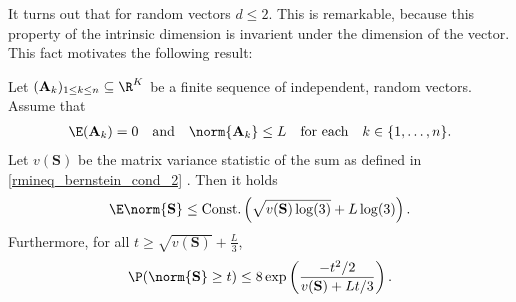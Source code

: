 It turns out that for random vectors $ d \le 2 $. This is remarkable, because this property of the intrinsic dimension is invarient under the dimension of the vector. This fact motivates the following result:
\begin{corollary}
  \label{rmineq_intrinsic_bernstein_vector_corollary}
  Let $(\mathbf{A}_k)_{1\le k \le n}\subseteq\R^{K}$ be a finite sequence of independent, random vectors. Assume that
    \begin{gather}
      \label{rmineq_bernstein_cond_1}
      \E(\mathbf{A}_k)=0\quad\text{and}\quad\norm{\mathbf{A}_k}\le L \quad \text{for each}\quad  k\in \{1,\ldots,n\}.
    \end{gather}
    Let $v(\mathbf{S})$ be the matrix variance statistic of the sum 
    as defined in
    \eqref{rmineq_bernstein_cond_2}
    .
  Then 
  it holds
      \begin{align}
        \label{rmineq_intrinsic_bernstein_expectation_bound}
        \E\norm{\mathbf{S}}\le \text{Const.}\left( \sqrt{v(\mathbf{S})\log(3)} + L\log(3) \right).
      \end{align}
    Furthermore, for all 
  $
    t
    \ge
    \sqrt{v(\mathbf{S})}
    +
    \frac{L}{3}
  $,
      \begin{gather}
        \label{rmineq_intrinsic_bernstein_probability_bound}
        \P(\norm{\mathbf{S}}\ge t)\le 8 \exp\left(\frac{-t^2/2}{v(\mathbf{S})+Lt/3} \right).
      \end{gather}
\end{corollary}
